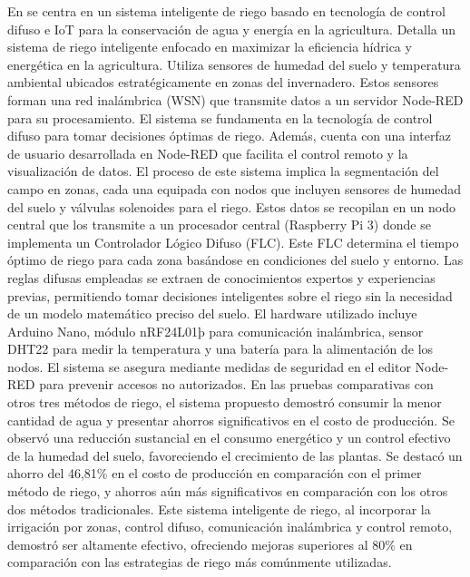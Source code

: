 \bigbreak
En \cite{benyezza_zoning_2021} se centra en un sistema inteligente de riego basado en tecnología de control difuso e IoT para la conservación de agua y energía en la agricultura. Detalla un sistema de riego inteligente enfocado en maximizar la eficiencia hídrica y energética en la agricultura. Utiliza sensores de humedad del suelo y temperatura ambiental ubicados estratégicamente en zonas del invernadero. Estos sensores forman una red inalámbrica (WSN) que transmite datos a un servidor Node-RED para su procesamiento. El sistema se fundamenta en la tecnología de control difuso para tomar decisiones óptimas de riego. Además, cuenta con una interfaz de usuario desarrollada en Node-RED que facilita el control remoto y la visualización de datos. El proceso de este sistema implica la segmentación del campo en zonas, cada una equipada con nodos que incluyen sensores de humedad del suelo y válvulas solenoides para el riego. Estos datos se recopilan en un nodo central que los transmite a un procesador central (Raspberry Pi 3) donde se implementa un Controlador Lógico Difuso (FLC). Este FLC determina el tiempo óptimo de riego para cada zona basándose en condiciones del suelo y entorno. Las reglas difusas empleadas se extraen de conocimientos expertos y experiencias previas, permitiendo tomar decisiones inteligentes sobre el riego sin la necesidad de un modelo matemático preciso del suelo. El hardware utilizado incluye Arduino Nano, módulo nRF24L01þ para comunicación inalámbrica, sensor DHT22 para medir la temperatura y una batería para la alimentación de los nodos. El sistema se asegura mediante medidas de seguridad en el editor Node-RED para prevenir accesos no autorizados. En las pruebas comparativas con otros tres métodos de riego, el sistema propuesto demostró consumir la menor cantidad de agua y presentar ahorros significativos en el costo de producción. Se observó una reducción sustancial en el consumo energético y un control efectivo de la humedad del suelo, favoreciendo el crecimiento de las plantas. Se destacó un ahorro del 46,81\% en el costo de producción en comparación con el primer método de riego, y ahorros aún más significativos en comparación con los otros dos métodos tradicionales. Este sistema inteligente de riego, al incorporar la irrigación por zonas, control difuso, comunicación inalámbrica y control remoto, demostró ser altamente efectivo, ofreciendo mejoras superiores al 80\% en comparación con las estrategias de riego más comúnmente utilizadas.

